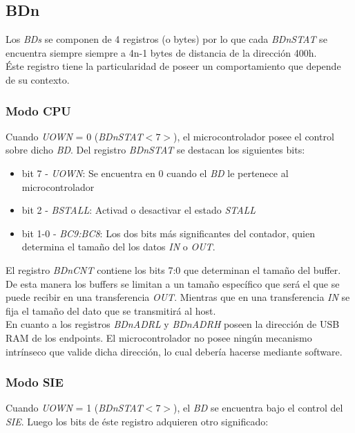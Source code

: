 \subsection{BDn}
Los \emph{BDs} se componen de 4 registros (o bytes) por lo que cada
\emph{BDnSTAT} se encuentra siempre siempre a 4n-1 bytes de distancia de la
direcci\'on 400h.\\

\'Este registro tiene la particularidad de poseer un comportamiento que
depende de su contexto.

\subsubsection{Modo CPU}
Cuando \emph{UOWN} = 0 (\emph{BDnSTAT$<7>$}), el microcontrolador posee el
control sobre dicho \emph{BD}. Del registro \emph{BDnSTAT} se destacan los
siguientes bits:

\begin{itemize}
 \item bit 7 - \emph{UOWN}: Se encuentra en 0 cuando el \emph{BD} le pertenece
al microcontrolador

 \item bit 2 - \emph{BSTALL}: Activad o desactivar el estado \emph{STALL}

 \item bit 1-0 - \emph{BC9:BC8}: Los dos bits m\'as significantes del
contador, quien determina el tama\~no del los datos \emph{IN} o \emph{OUT}.
\end{itemize}

El registro \emph{BDnCNT} contiene los bits 7:0 que determinan el tama\~no del
buffer. De esta manera los buffers se limitan a un tama\~no espec\'ifico que
ser\'a el que se puede recibir en una transferencia \emph{OUT}. Mientras que
en una transferencia \emph{IN} se fija el tama\~no del dato que se
transmitir\'a al host.\\

En cuanto a los registros \emph{BDnADRL} y \emph{BDnADRH} poseen la
direcci\'on de USB RAM de los endpoints. El microcontrolador no posee ning\'un
mecanismo intr\'inseco que valide dicha direcci\'on, lo cual deber\'ia hacerse
mediante software.\\

\subsubsection{Modo SIE}
Cuando \emph{UOWN} = 1 (\emph{BDnSTAT$<7>$}), el \emph{BD} se encuentra bajo
el control del \emph{SIE}. Luego los bits de \'este registro adquieren otro
significado:

